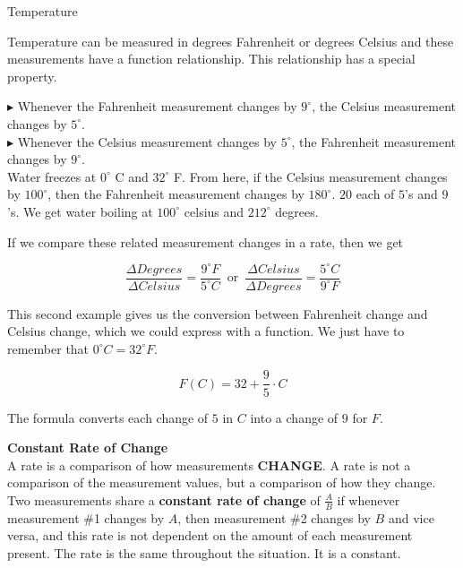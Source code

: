 \documentclass{ximera}
\begin{document}
\begin{example} Temperature


Temperature can be measured in degrees Fahrenheit or degrees Celsius and these measurements have a function relationship. This relationship has a special property.


$\blacktriangleright$ Whenever the Fahrenheit measurement changes by $9^{\circ}$, the Celsius measurement changes by $5^{\circ}$. \\
$\blacktriangleright$ Whenever the Celsius measurement changes by $5^{\circ}$, the Fahrenheit measurement changes by $9^{\circ}$. \\



Water freezes at $0^{\circ}$ C and $32^{\circ}$ F.  From here, if the Celsius measurement changes by $100^{\circ}$, then the Fahrenheit measurement changes by $180^{\circ}$.  $20$ each of $5$'s and $9$'s. We get water boiling at $100^{\circ}$ celsius and $212^{\circ}$ degrees.


If we compare these related measurement changes in a rate, then we get

\[
\frac{\Delta Degrees}{\Delta Celsius} = \frac{9^{\circ}F}{5^{\circ}C} \, \text{ or } \, \frac{\Delta Celsius}{\Delta Degrees} = \frac{5^{\circ}C}{9^{\circ}F}
\]


\end{example} 


This second example gives us the conversion between Fahrenheit change and Celsius change, which we could express with a function.  We just have to remember that $0^{\circ}C = 32^{\circ}F$.

\[
F(C) = 32 + \frac{9}{5} \cdot C
\]


The formula converts each change of $5$ in $C$ into a change of $9$ for $F$.







\begin{definition} \textbf{\textcolor{green!50!black}{Constant Rate of Change}} \\


A rate is a comparison of how measurements \textbf{\textcolor{purple!85!blue}{CHANGE}}. A rate is not a comparison of the measurement values, but a comparison of how they change. \\


Two measurements share a \textbf{constant rate of change} of $\tfrac{A}{B}$ if whenever measurement \#1 changes by $A$, then measurement \#2 changes by $B$ and vice versa, and this rate is not dependent on the amount of each measurement present.  The rate is the same throughout the situation.  It is a constant.




\end{definition}
\end{document}
